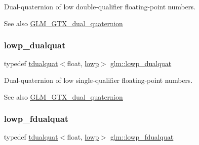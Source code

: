 Dual-\/quaternion of low double-\/qualifier floating-\/point numbers.

\begin{DoxySeeAlso}{See also}
\mbox{\hyperlink{group__gtx__dual__quaternion}{G\+L\+M\+\_\+\+G\+T\+X\+\_\+dual\+\_\+quaternion}} 
\end{DoxySeeAlso}
\mbox{\label{group__gtx__dual__quaternion_ga4888200ed911e4887c2423fed74ad362}} 
\subsubsection{\texorpdfstring{lowp\+\_\+dualquat}{lowp\_dualquat}}
{\footnotesize\ttfamily typedef \mbox{\hyperlink{structglm_1_1tdualquat}{tdualquat}}$<$float, \mbox{\hyperlink{namespaceglm_a36ed105b07c7746804d7fdc7cc90ff25ae161af3fc695e696ce3bf69f7332bc2d}{lowp}}$>$ \mbox{\hyperlink{group__gtx__dual__quaternion_ga4888200ed911e4887c2423fed74ad362}{glm\+::lowp\+\_\+dualquat}}}

Dual-\/quaternion of low single-\/qualifier floating-\/point numbers.

\begin{DoxySeeAlso}{See also}
\mbox{\hyperlink{group__gtx__dual__quaternion}{G\+L\+M\+\_\+\+G\+T\+X\+\_\+dual\+\_\+quaternion}} 
\end{DoxySeeAlso}
\mbox{\label{group__gtx__dual__quaternion_ga797f6d2679ab6773c1f057b97bf95111}} 
\subsubsection{\texorpdfstring{lowp\+\_\+fdualquat}{lowp\_fdualquat}}
{\footnotesize\ttfamily typedef \mbox{\hyperlink{structglm_1_1tdualquat}{tdualquat}}$<$float, \mbox{\hyperlink{namespaceglm_a36ed105b07c7746804d7fdc7cc90ff25ae161af3fc695e696ce3bf69f7332bc2d}{lowp}}$>$ \mbox{\hyperlink{group__gtx__dual__quaternion_ga797f6d2679ab6773c1f057b97bf95111}{glm\+::lowp\+\_\+fdualquat}}}

